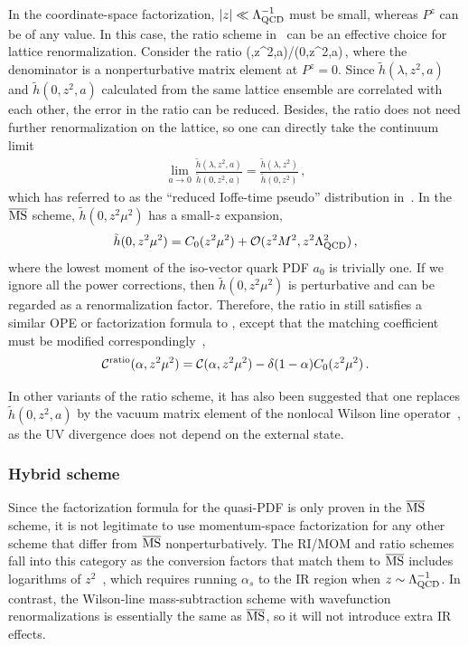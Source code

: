 In the coordinate-space factorization, $|z|\ll \Lambda^{-1}_{\rm QCD}$ must be small, whereas
$P^z$ can be of any value. In this case, the ratio scheme in~\cite{Radyushkin:2017cyf,Orginos:2017kos} can be an effective choice for lattice renormalization.
Consider the ratio
\beq \label{eq:ratio}
(\lambda,z^2,a)/(0,z^2,a)\,,
\eeq
where the denominator is a nonperturbative matrix element at $P^z=0$. Since $\tilde{h}(\lambda,z^2,a)$ and $\tilde{h}(0,z^2,a)$ calculated from the same lattice ensemble are correlated with each other, the error in the ratio can be reduced.
Besides, the ratio does not need further renormalization on the lattice, so one can directly take the continuum limit
\begin{align} \label{eq:ratio1}
	\lim_{a\to0}\frac{\tilde{h}(\lambda,z^2,a)}{\tilde{h}(0,z^2,a)} = \frac{\tilde{h}(\lambda,z^2)}{\tilde{h}(0,z^2)}\,,
\end{align}
which has referred to as the ``reduced Ioffe-time pseudo'' distribution in~\cite{Radyushkin:2017cyf,Orginos:2017kos}.
In the ${\overline{\rm MS}}$ scheme, $\tilde{h}(0,z^2\mu^2)$ has a small-$z$ expansion,
\begin{align}
	\tilde{h}(0,z^2\mu^2) = C_0(z^2\mu^2) + {\cal O}(z^2M^2, z^2\Lambda_{\rm QCD}^2)\,,
\end{align}
where the lowest moment of the iso-vector quark PDF $a_0$ is trivially one.
If we ignore all the power corrections, then $\tilde{h}(0,z^2\mu^2)$ is perturbative and can be regarded as a renormalization factor. Therefore, the ratio in  still satisfies a similar OPE or factorization formula to , except that the matching coefficient must be modified correspondingly~\cite{Radyushkin:2017lvu,Izubuchi:2018srq},
\begin{align}
	{\cal C}^{\rm ratio}(\alpha,z^2\mu^2)= {\cal C}(\alpha,z^2\mu^2) - \delta(1-\alpha)C_0(z^2\mu^2)\,.
\end{align}

In other variants of the ratio scheme, it has also been suggested that one replaces $\tilde{h}(0,z^2,a)$ by the vacuum matrix element of the nonlocal Wilson line operator~\cite{Braun:2018brg,Li:2020xml}, as the UV divergence does not depend on the external state.


\subsubsection{Hybrid scheme}
\label{sec:hybrid}

Since the factorization formula for the quasi-PDF is only proven in the ${\overline{\rm MS}}$ scheme, it is not legitimate to use momentum-space factorization for any other scheme that differ from ${\overline{\rm MS}}$ nonperturbatively. The RI/MOM and ratio schemes fall into this category as the conversion factors that match them to ${\overline{\rm MS}}$ includes logarithms of $z^2$~\cite{Constantinou:2017sej,Izubuchi:2018srq}, which requires running $\alpha_s$ to the IR region when $z\sim \Lambda_{\rm QCD}^{-1}$. In contrast, the Wilson-line mass-subtraction scheme with wavefunction renormalizations is essentially the same as ${\overline{\rm MS}}$, so it will not introduce extra IR effects.

